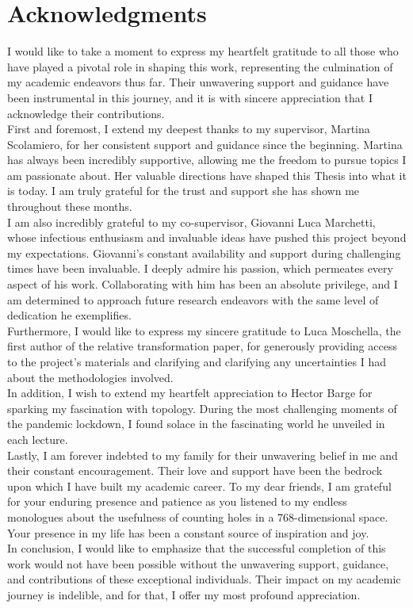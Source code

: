 \documentclass[../main.tex]{subfiles}
\begin{document}
\section*{Acknowledgments}
I would like to take a moment to express my heartfelt gratitude to all those who have played a pivotal role in shaping this work, representing the culmination of my academic endeavors thus far. Their unwavering support and guidance have been instrumental in this journey, and it is with sincere appreciation that I acknowledge their contributions.\\

First and foremost, I extend my deepest thanks to my supervisor, Martina Scolamiero, for her consistent support and guidance since the beginning. Martina has always been incredibly supportive, allowing me the freedom to pursue topics I am passionate about. Her valuable directions have shaped this Thesis into what it is today. I am truly grateful for the trust and support she has shown me throughout these months.\\

I am also incredibly grateful to my co-supervisor, Giovanni Luca Marchetti, whose infectious enthusiasm and invaluable ideas have pushed this project beyond my expectations. Giovanni's constant availability and support during challenging times have been invaluable. I deeply admire his passion, which permeates every aspect of his work. Collaborating with him has been an absolute privilege, and I am determined to approach future research endeavors with the same level of dedication he exemplifies.\\

Furthermore, I would like to express my sincere gratitude to Luca Moschella, the first author of the relative transformation paper, for generously providing access to the project's materials and clarifying and clarifying any uncertainties I had about the methodologies involved.\\

In addition, I wish to extend my heartfelt appreciation to Hector Barge for sparking my fascination with topology. During the most challenging moments of the pandemic lockdown, I found solace in the fascinating world he unveiled in each lecture.\\ 

Lastly, I am forever indebted to my family for their unwavering belief in me and their constant encouragement. Their love and support have been the bedrock upon which I have built my academic career. To my dear friends, I am grateful for your enduring presence and patience as you listened to my endless monologues about the usefulness of counting holes in a 768-dimensional space. Your presence in my life has been a constant source of inspiration and joy.\\

In conclusion, I would like to emphasize that the successful completion of this work would not have been possible without the unwavering support, guidance, and contributions of these exceptional individuals. Their impact on my academic journey is indelible, and for that, I offer my most profound appreciation.
\acknowlegmentssignature
\end{document}
